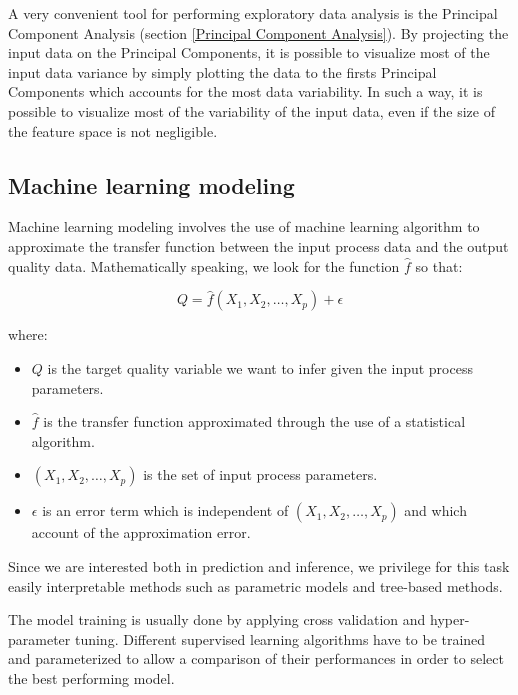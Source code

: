 A very convenient tool for performing exploratory data analysis is the Principal Component Analysis (section \ref{Principal Component Analysis}). By projecting the input data on the Principal Components, it is possible to visualize most of the input data variance by simply plotting the data to the firsts Principal Components which accounts for the most data variability. In such a way, it is possible to visualize most of the variability of the input data, even if the size of the feature space is not negligible. 

\subsection{Machine learning modeling} \label{Machine Learning modeling}

Machine learning modeling involves the use of machine learning algorithm to approximate the transfer function between the input process data and the output quality data. Mathematically speaking, we look for the function $\hat{f}$ so that:

\begin{equation}
    Q = \hat{f}(X_1,X_2,\ldots,X_p) + \epsilon
\end{equation}

where:

\begin{itemize}
    \item $Q$ is the target quality variable we want to infer given the input process parameters.
    \item $\hat{f}$ is the transfer function approximated through the use of a statistical algorithm.
    \item $(X_1,X_2,\ldots,X_p)$ is the set of input process parameters.
    \item $\epsilon$ is an error term which is independent of $(X_1,X_2,\ldots,X_p)$ and which account of the approximation error. 
\end{itemize}

Since we are interested both in prediction and inference, we privilege for this task easily interpretable methods such as parametric models and tree-based methods. 


The model training is usually done by applying cross validation and hyper-parameter tuning. Different supervised learning algorithms have to be trained and parameterized to allow a comparison of their performances in order to select the best performing model. 

